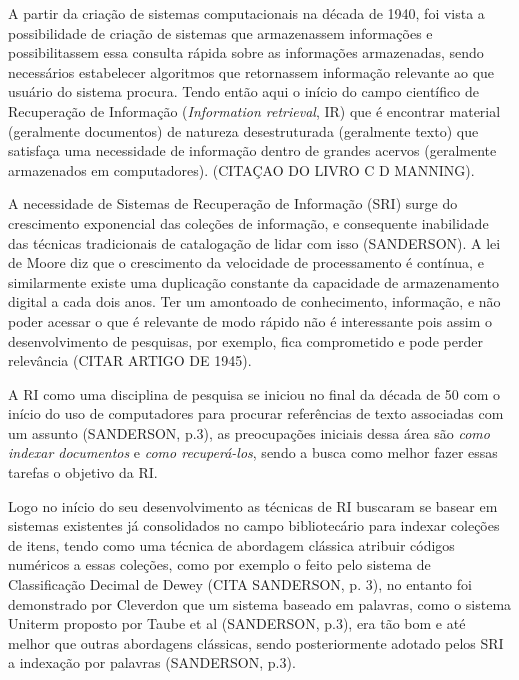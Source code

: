 
A partir da criação de sistemas computacionais na década de 1940, foi vista a possibilidade de criação de sistemas que armazenassem informações e possibilitassem essa consulta rápida sobre as informações armazenadas, sendo necessários estabelecer algoritmos que retornassem informação relevante ao que usuário do sistema procura. Tendo então aqui o início do campo científico de Recuperação de Informação (\textit{Information retrieval}, IR) que é encontrar material (geralmente documentos) de natureza desestruturada (geralmente texto) que satisfaça uma necessidade de informação dentro de grandes acervos (geralmente armazenados em computadores). (CITAÇAO DO LIVRO C D MANNING).

A necessidade de Sistemas de Recuperação de Informação (SRI) surge do crescimento exponencial das coleções de informação, e consequente inabilidade das técnicas tradicionais de catalogação de lidar com isso (SANDERSON). A lei de Moore diz que o crescimento da velocidade de processamento é contínua, e similarmente existe uma duplicação constante da capacidade de armazenamento digital a cada dois anos. 
Ter um amontoado de conhecimento, informação, e não poder acessar o que é relevante de modo rápido não é interessante pois assim o desenvolvimento de pesquisas, por exemplo, fica comprometido e pode perder relevância (CITAR ARTIGO DE 1945).

A RI como uma disciplina de pesquisa se iniciou no final da década de 50 com o início do uso de computadores para procurar referências de texto associadas com um assunto (SANDERSON, p.3), as preocupações iniciais dessa área são \textit{como indexar documentos} e \textit{como recuperá-los}, sendo a busca como melhor fazer essas tarefas o objetivo da RI.

Logo no início do seu desenvolvimento as técnicas de RI buscaram se basear em sistemas existentes já consolidados no campo bibliotecário para indexar coleções de itens, tendo como uma técnica de abordagem clássica atribuir códigos numéricos a essas coleções, como por exemplo o feito pelo sistema de Classificação Decimal de Dewey (CITA SANDERSON, p. 3), no entanto foi demonstrado por Cleverdon que um sistema baseado em palavras, como o sistema Uniterm proposto por Taube et al (SANDERSON, p.3), era tão bom e até melhor que outras abordagens clássicas, sendo posteriormente adotado pelos SRI a indexação por palavras (SANDERSON, p.3).

